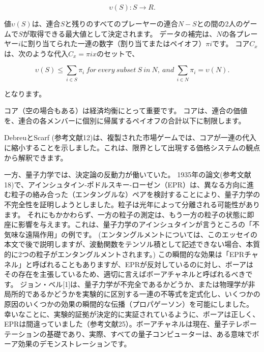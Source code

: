 \begin{equation}
\label{7}
\upsilon (S) : S \rightarrow R.
\end{equation}

値$\upsilon (S)$は、連合$S$と残りのすべてのプレーヤーの連合$N - S$との間の2人のゲームで$S$が取得できる最大値として決定されます。
データの補完は、$N$の各プレーヤー$i$に割り当てられた一連の数字（割り当てまたはペイオフ）${\pi i}$です。
コア$C_x$は、次のような代入$C_x = {{\pi i} x}$のセットで、

\begin{equation}
\label{8}
\upsilon (S)  \leq  \sum_{i \in S} \pi_i \ for \ every \ subset\ S \ in \ N, \ and \ \sum_{i \in N} \pi_i = \upsilon (N).
\end{equation}

となります。

コア（空の場合もある）は経済均衡にとって重要です。
コアは、連合の価値を、連合の各メンバーに個別に帰属するペイオフの合計以下に制限します。

DebreuとScarf (参考文献12)は、複製された市場ゲームでは、コアが一連の代入に縮小することを示しました。これは、限界として出現する価格システムの観点から解釈できます。

一方、量子力学では、決定論の反動力が働いていた。
1935年の論文(参考文献18)で、アインシュタイン-ポドルスキー-ローゼン（EPR）は、異なる方向に進む粒子の絡み合った（エンタングルな）ペアを検討することにより、量子力学の不完全性を証明しようとしました。粒子は光年によって分離される可能性があります。
それにもかかわらず、一方の粒子の測定は、もう一方の粒子の状態に即座に影響を与えます。これは、量子力学のアインシュタインが言うところの「不気味な遠隔作用」の例です。
(エンタングルメントについては、このエッセイの本文で後で説明しますが、波動関数をテンソル積として記述できない場合、本質的に2つの粒子がエンタングルメントされます。)
この瞬間的な効果は「EPRチャネル」と呼ばれることもありますが、EPRが反対しているのに対し、ボーアはその存在を主張しているため、適切に言えばボーアチャネルと呼ばれるべきです。
ジョン・ベル[1]は、量子力学が不完全であるかどうか、または物理学が非局所的であるかどうかを実験的に区別する一連の不等式を定式化し、いくつかの原因のいくつかの効果の瞬間的な伝播（プロパゲーソン）を可能にしました。
幸いなことに、実験的証拠が決定的に実証されているように、ボーアは正しく、EPRは間違っていました（参考文献25）。ボーアチャネルは現在、量子テレポーテーションの基礎であり、実際、すべての量子コンピューターは、ある意味でボーア効果のデモンストレーションです。

